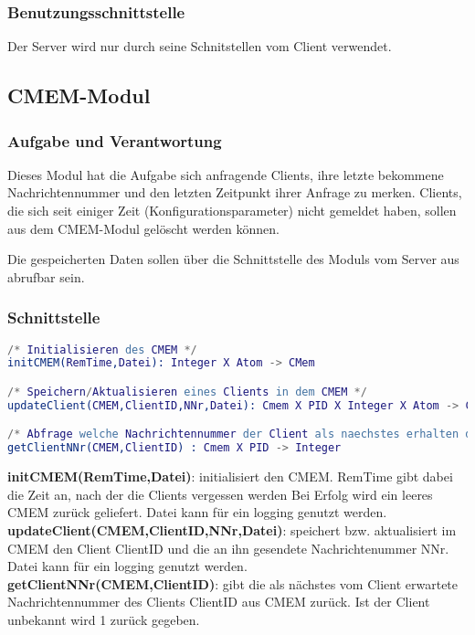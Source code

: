 \documentclass{article}
\begin{document}
\subsubsection{Benutzungsschnittstelle}
Der Server wird nur durch seine Schnitstellen vom Client verwendet.
\newpage

\subsection{CMEM-Modul}
\subsubsection{Aufgabe und Verantwortung}
Dieses Modul hat die Aufgabe sich anfragende Clients, ihre letzte bekommene Nachrichtennummer und den letzten Zeitpunkt ihrer Anfrage zu merken.
Clients, die sich seit einiger Zeit (Konfigurationsparameter) nicht gemeldet haben, sollen aus dem CMEM-Modul gelöscht werden können.

Die gespeicherten Daten sollen über die Schnittstelle des Moduls vom Server aus abrufbar sein.

\subsubsection{Schnittstelle}
\begin{lstlisting}[language=erlang]
/* Initialisieren des CMEM */
initCMEM(RemTime,Datei): Integer X Atom -> CMem

/* Speichern/Aktualisieren eines Clients in dem CMEM */
updateClient(CMEM,ClientID,NNr,Datei): Cmem X PID X Integer X Atom -> CMem

/* Abfrage welche Nachrichtennummer der Client als naechstes erhalten darf */
getClientNNr(CMEM,ClientID) : Cmem X PID -> Integer
\end{lstlisting}

\textbf{initCMEM(RemTime,Datei)}: initialisiert den CMEM. RemTime gibt dabei die Zeit an, nach der die Clients vergessen werden Bei Erfolg wird ein leeres CMEM zurück geliefert. Datei kann für ein logging genutzt werden.\\

\textbf{updateClient(CMEM,ClientID,NNr,Datei)}: speichert bzw. aktualisiert im CMEM den Client ClientID und die an ihn gesendete Nachrichtenummer NNr. Datei kann für ein logging genutzt werden.\\

\textbf{getClientNNr(CMEM,ClientID)}: gibt die als nächstes vom Client erwartete Nachrichtennummer des Clients ClientID aus CMEM zurück. Ist der Client unbekannt wird 1 zurück gegeben.\\
\end{document}
